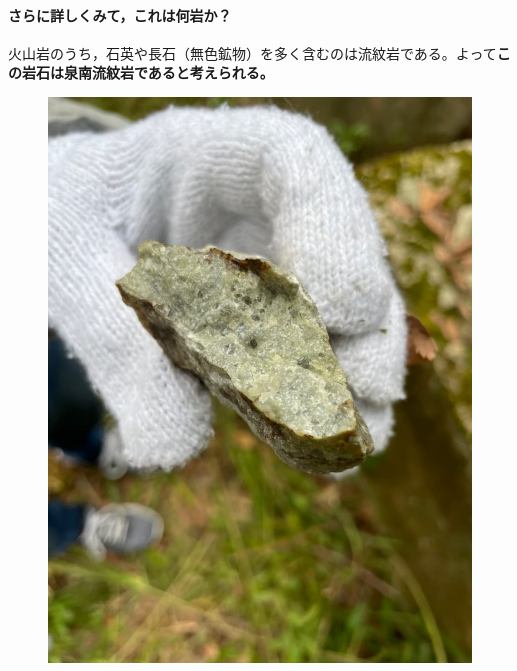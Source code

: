 \documentclass[uplatex,b5paper]{jsreport}
\begin{document}
      \paragraph{さらに詳しくみて，これは何岩か？}
      火山岩のうち，石英や長石（無色鉱物）を多く含むのは流紋岩である。よって\textbf{この岩石は泉南流紋岩であると考えられる。}
  \begin{figure}[h]
    \begin{center}
      \includegraphics[scale=0.12]{files/地学実習/泉南流紋岩.jpg}

\end{center}
\end{figure}
\end{document}
